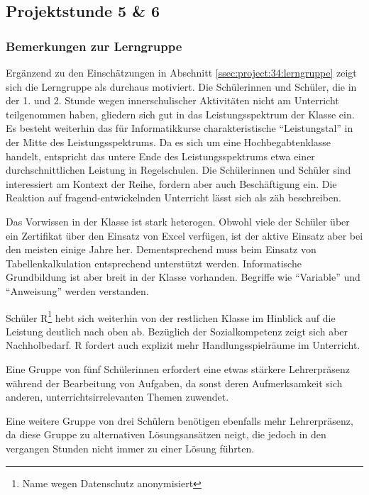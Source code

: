 \subsection{Projektstunde 5 \& 6}\steffen
\subsubsection*{Bemerkungen zur Lerngruppe}
Ergänzend zu den Einschätzungen in Abschnitt \ref{ssec:project:34:lerngruppe} zeigt sich die Lerngruppe als durchaus motiviert. Die Schülerinnen und Schüler, die in der 1. und 2. Stunde wegen innerschulischer Aktivitäten nicht am Unterricht teilgenommen haben, gliedern sich gut in das Leistungsspektrum der Klasse ein. Es besteht weiterhin das für Informatikkurse charakteristische ``Leistungstal'' in der Mitte des Leistungsspektrums. Da es sich um eine Hochbegabtenklasse handelt, entspricht das untere Ende des Leistungsspektrums etwa einer durchschnittlichen Leistung in Regelschulen. Die Schülerinnen und Schüler sind interessiert am Kontext der Reihe, fordern aber auch Beschäftigung ein. Die Reaktion auf fragend-entwickelnden Unterricht lässt sich als zäh beschreiben. 

Das Vorwissen in der Klasse ist stark heterogen. Obwohl viele der Schüler über ein Zertifikat über den Einsatz von Excel verfügen, ist der aktive Einsatz aber bei den meisten einige Jahre her. Dementsprechend muss beim Einsatz von Tabellenkalkulation entsprechend unterstützt werden. Informatische Grundbildung ist aber breit in der Klasse vorhanden. Begriffe wie ``Variable'' und ``Anweisung'' werden verstanden. 

Schüler R\footnote{Name wegen Datenschutz anonymisiert} hebt sich weiterhin von der restlichen Klasse im Hinblick auf die Leistung deutlich nach oben ab. Bezüglich der Sozialkompetenz zeigt sich aber Nachholbedarf. R fordert auch explizit mehr Handlungsspielräume im Unterricht.

Eine Gruppe von fünf Schülerinnen erfordert eine etwas stärkere Lehrerpräsenz während der Bearbeitung von Aufgaben, da sonst deren Aufmerksamkeit sich anderen, unterrichtsirrelevanten Themen zuwendet. 

Eine weitere Gruppe von drei Schülern benötigen ebenfalls mehr Lehrerpräsenz, da diese Gruppe zu alternativen Lösungsansätzen neigt, die jedoch in den vergangen Stunden nicht immer zu einer Lösung führten.
